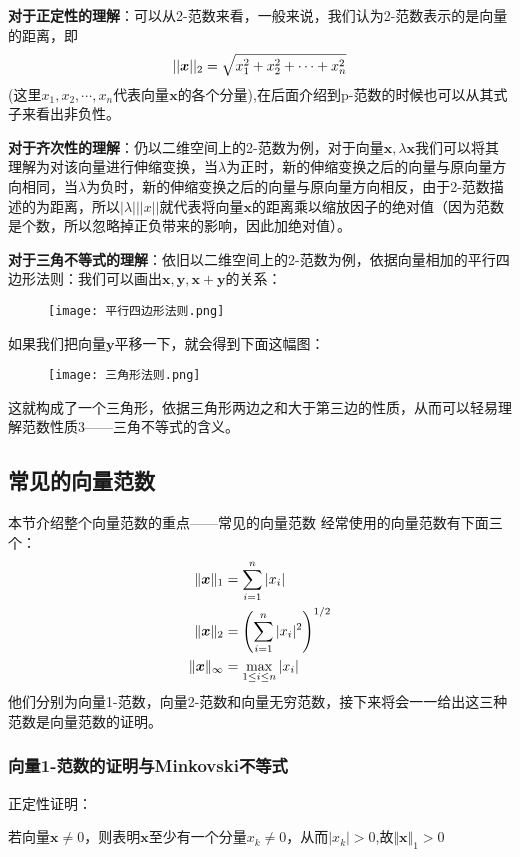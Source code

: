\documentclass[12pt, a4paper, oneside, UTF8]{ctexbook}
\begin{document}
\textbf{对于正定性的理解}：可以从2-范数来看，一般来说，我们认为2-范数表示的是向量的距离，即\[||\boldsymbol{x}||_2=\sqrt{x_1^2+x_2^2+\cdots+x_n^2}\](这里$x_1,x_2,\cdots,x_n$代表向量$\boldsymbol{x}$的各个分量),在后面介绍到p-范数的时候也可以从其式子来看出非负性。

\textbf{对于齐次性的理解}：仍以二维空间上的2-范数为例，对于向量$\boldsymbol{x},\lambda\boldsymbol{x}$我们可以将其理解为对该向量进行伸缩变换，当$\lambda$为正时，新的伸缩变换之后的向量与原向量方向相同，当$\lambda$为负时，新的伸缩变换之后的向量与原向量方向相反，由于2-范数描述的为距离，所以$|\lambda|||x||$就代表将向量$\boldsymbol{x}$的距离乘以缩放因子的绝对值（因为范数是个数，所以忽略掉正负带来的影响，因此加绝对值）。

\textbf{对于三角不等式的理解}：依旧以二维空间上的2-范数为例，依据向量相加的平行四边形法则：我们可以画出$\boldsymbol{x}, \boldsymbol{y},\boldsymbol{x+y}$的关系：
\begin{figure}[h]
    \centering
    \texttt{[image: 平行四边形法则.png]}
\end{figure}

如果我们把向量$\boldsymbol{y}$平移一下，就会得到下面这幅图：
\begin{figure}[h]
    \centering
    \texttt{[image: 三角形法则.png]}
\end{figure}

这就构成了一个三角形，依据三角形两边之和大于第三边的性质，从而可以轻易理解范数性质3——三角不等式的含义。
\subsection{常见的向量范数}{\label{sec2.1.4}}
本节介绍整个向量范数的重点——常见的向量范数
经常使用的向量范数有下面三个：
\[
\begin{aligned}
    \Vert\boldsymbol{x}\Vert_1&=\sum\limits_{i=1}^n|x_i|\\
    \Vert\boldsymbol{x}\Vert_2&=\left(\sum\limits_{i=1}^n|x_i|^2\right)^{1/2}\\
    \Vert\boldsymbol{x}\Vert_{\infty}&=\max\limits_{1\leq i\leq n}|x_i|
\end{aligned}
\]
他们分别为向量1-范数，向量2-范数和向量无穷范数，接下来将会一一给出这三种范数是向量范数的证明。

\subsubsection{向量1-范数的证明与Minkovski不等式}
\noindent
正定性证明：

若向量$\boldsymbol{x}\neq 0$，则表明$\boldsymbol{x}$至少有一个分量$x_k\neq 0$，从而$|x_k|>0$,故$\Vert \boldsymbol{x}\Vert_1>0$
\end{document}
